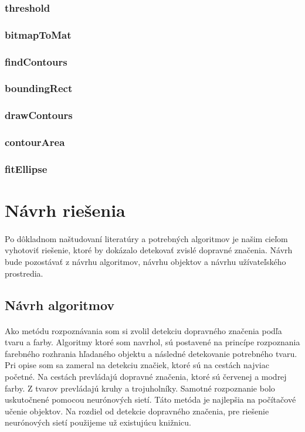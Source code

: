 \documentclass[12pt]{article}
\begin{document}
\subsubsection{threshold}
\subsubsection{bitmapToMat}
\subsubsection{findContours}
\subsubsection{boundingRect}
\subsubsection{drawContours}
\subsubsection{contourArea}
\subsubsection{fitEllipse}

\section{Návrh riešenia}
\paragraph{}
Po dôkladnom naštudovaní literatúry a potrebných algoritmov je našim cieľom vyhotoviť riešenie, ktoré by dokázalo detekovať zvislé dopravné značenia.
Návrh bude pozostávať z návrhu algoritmov, návrhu objektov a návrhu užívateľského prostredia.
\subsection{Návrh algoritmov}
\paragraph{}
Ako metódu rozpoznávania som si zvolil detekciu dopravného značenia podľa tvaru a farby. 
Algoritmy ktoré som navrhol, sú postavené na princípe rozpoznania farebného rozhrania hľadaného objektu a následné detekovanie potrebného tvaru.
Pri opise som sa zameral na detekciu značiek, ktoré sú na cestách najviac početné.
Na cestách prevládajú dopravné značenia, ktoré sú červenej a modrej farby. Z tvarov prevládajú kruhy a trojuholníky.
Samotné rozpoznanie bolo uskutočnené pomocou neurónových sietí. Táto metóda je najlepšia na počítačové učenie objektov.
Na rozdiel od detekcie dopravného značenia, pre riešenie neurónových sietí použijeme už existujúcu knižnicu.
\end{document}
